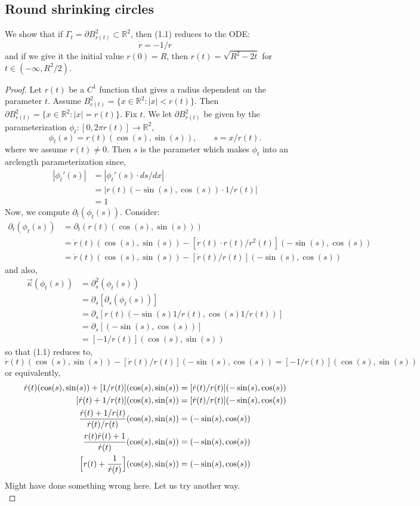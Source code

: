 \documentclass{article}
\begin{document}
\subsection{Round shrinking circles}
We show that if $\Gamma_t = \partial B^2_{r(t)}\subset\mathbb{R}^2$, then (1.1) reduces to the ODE:
\[ \dot{r} = -1/r \]
and if we give it the initial value $r(0) = R$, then $r(t) = \sqrt{R^2 - 2t}$ for $t\in(-\infty,R^2/2)$.
\begin{proof}
    Let $r(t)$ be a $C^1$ function that gives a radius dependent on the parameter $t$.
    Assume $B^2_{r(t)} = \{x\in\mathbb{R}^2: |x|< r(t)\}$. Then $\partial B^2_{r(t)} = \{x\in\mathbb{R}^2:|x|=r(t)\}$.
    Fix $t$. We let $\partial B^2_{r(t)}$ be given by the parameterization $\phi_t: [0,2\pi r(t)]\to\mathbb{R}^2$,
    \[ \phi_t(s) = r(t)(\cos(s),\sin(s)),\qquad s = x/r(t). \]
    where we assume $r(t)\neq 0$. Then $s$ is the parameter which makes $\phi_t$ into an arclength parameterization
    since,
    \begin{align*}
        |\phi_t'(s)| &= |\phi_t'(s)\cdot ds/dx| \\
            &= |r(t)(-\sin(s),\cos(s))\cdot 1/r(t)| \\
            &= 1
    \end{align*}
    Now, we compute $\partial_t(\phi_t(s))$. Consider:
    \begin{align*}
        \partial_t(\phi_t(s)) &= \partial_t(r(t)(\cos(s),\sin(s))) \\
            &= \dot{r}(t)(\cos(s),\sin(s)) - [\dot{r}(t)\cdot r(t)/r^2(t)](-\sin(s),\cos(s)) \\
            &= \dot{r}(t)(\cos(s),\sin(s))  - [\dot{r}(t)/r(t)](-\sin(s),\cos(s))
    \end{align*}
    and also,
    \begin{align*}
        \vec{\kappa}(\phi_t(s)) &= \partial_s^2(\phi_t(s)) \\
            &= \partial_s[\partial_s(\phi_t(s))] \\
            &= \partial_s[r(t)(-\sin(s)1/r(t),\cos(s)1/r(t))] \\
            &= \partial_s[(-\sin(s),\cos(s))] \\
            &= [-1/r(t)](\cos(s),\sin(s))
    \end{align*}
    so that (1.1) reduces to,
    \[ \dot{r}(t)(\cos(s),\sin(s))  - [\dot{r}(t)/r(t)](-\sin(s),\cos(s)) = [-1/r(t)](\cos(s),\sin(s)) \]
    or equivalently,
    \begin{align*}
    	\dot{r}(t)(\cos(s),\sin(s)) + [1/r(t)](\cos(s),\sin(s)) &= [\dot{r}(t)/r(t)](-\sin(s),\cos(s)) \\
	[\dot{r}(t) + 1/r(t)](\cos(s),\sin(s)) &= [\dot{r}(t)/r(t)](-\sin(s),\cos(s)) \\
	\frac{\dot{r}(t) + 1/r(t)}{\dot{r}(t)/r(t)}(\cos(s),\sin(s)) &= (-\sin(s),\cos(s)) \\
	\frac{r(t)\dot{r}(t) + 1}{\dot{r}(t)}(\cos(s),\sin(s)) &= (-\sin(s),\cos(s)) \\
	\Big{[}r(t) + \frac{1}{\dot{r}(t)}\Big{]}(\cos(s),\sin(s)) &= (-\sin(s),\cos(s))
    \end{align*}
    Might have done something wrong here. Let us try another way.\\
    

\end{proof}
\end{document}
